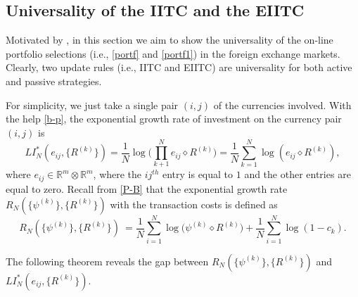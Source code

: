\documentclass[11pt]{article}
\numberwithin{equation}{section}
\begin{document}
\subsection{Universality of the IITC and the EIITC}
 Motivated by \cite{ALZ2001},  in this section we aim  to show the universality of the on-line portfolio selections (i.e., \eqref{portf} and \eqref{portf1}) in the foreign exchange markets. Clearly, two update rules (i.e.,  IITC and EIITC)  are universality for both active and passive strategies. 

For simplicity, we just take a single pair $(i,j) $ of the currencies involved.  With the help \eqref{b-p},   the exponential growth rate of investment on the currency pair $(i,j) $    is
\begin{equation}\label{ren1}
LI^*_N(e_{ij},\{R^{(k)}\})=\frac{1}{N}\log\bigg(\prod_{k+1}^N e_{ij}\diamond R^{(k)}\bigg)=\frac{1}{N}\sum_{k=1}^{N}\log (e_{ij}\diamond R^{(k)}),
\end{equation}
where $e_{ij} \in \mathbb{R}^m\otimes \mathbb{R}^m$, where  the $ij^{th}$ entry is equal to $1$ and the other entries are equal to zero. Recall from   \eqref{P-B} that the  exponential growth rate $R_N(\{\psi^{(k)}\},\{R^{(k)}\})$ with the transaction costs is defined as  
\begin{equation}\label{Ren}
R_N(\{\psi^{(k)}\},\{R^{(k)}\})\:= \frac{1}{N}\sum_{i=1}^{N}\log \Big(\psi^{(k)}\diamond R^{(k)}\Big)+\frac{1}{N}\sum_{i=1}^{N}\log (1-c_k).\end{equation} 

The following theorem reveals  the gap between $R_N(\{\psi^{(k)}\},\{R^{(k)}\})$ and $LI^*_N(e_{ij},\{R^{(k)}\})$. 
\end{document}
